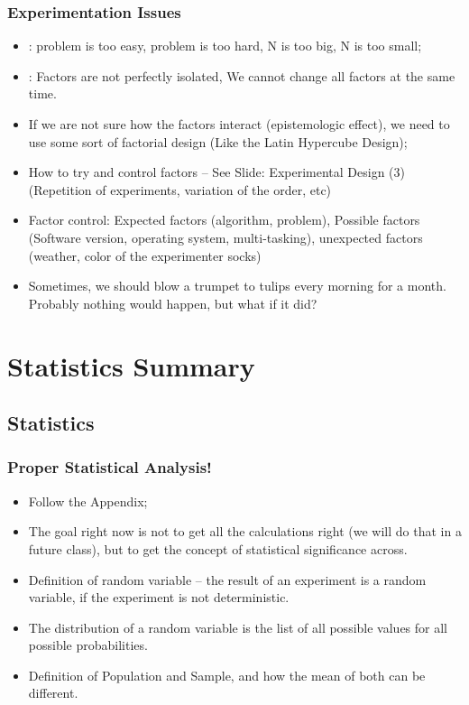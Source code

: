 \documentclass{beamer}
\begin{document}
\begin{frame}
  \frametitle{Experimentation Issues}
  \begin{itemize}
  \item {}: problem is too easy, problem is too
    hard, N is too big, N is too small;
  \item {}: Factors are not perfectly
    isolated, We cannot change all factors at the same time. 
  \item If we are not sure how the factors interact (epistemologic
    effect), we need to use some sort of factorial design (Like the
    Latin Hypercube Design);
  \item How to try and control factors -- See Slide: Experimental
    Design (3) (Repetition of experiments, variation of the order, etc)
  \item Factor control: Expected factors (algorithm, problem),
    Possible factors (Software version, operating system,
    multi-tasking), unexpected factors (weather, color of the
    experimenter socks)
  \item Sometimes, we should blow a trumpet to tulips every morning
    for a month. Probably nothing would happen, but what if it did?
  \end{itemize}
\end{frame}

\section{Statistics Summary}
\subsection{Statistics}
\begin{frame}
  \frametitle{Proper Statistical Analysis!}
  \begin{itemize}
  \item Follow the Appendix;
  \item The goal right now is not to get all the calculations right
    (we will do that in a future class), but to get the concept of
    statistical significance across.
  \item Definition of random variable -- the result of an experiment
    is a random variable, if the experiment is not deterministic.
  \item The distribution of a random variable is the list of all
    possible values for all possible probabilities.
  \item Definition of Population and Sample, and how the mean of both
    can be different.
  \end{itemize}
\end{frame}
\end{document}
